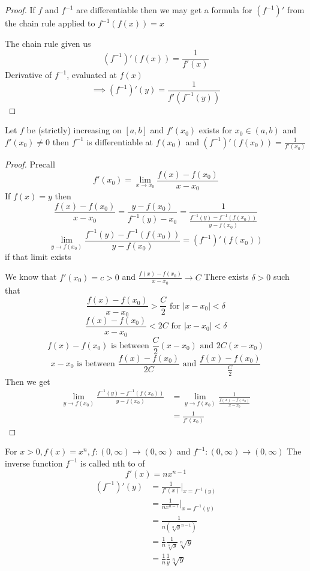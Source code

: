 \begin{proof}
  If $f$ and $f^{-1}$ are differentiable then we may get a formula for $(f^{-1})'$ from the chain rule applied to $f^{-1}(f(x)) = x$

  The chain rule given us
  $$(f^{-1})'(f(x)) = \frac{1}{f'(x)}$$
  Derivative of $f^{-1}$, evaluated at $f(x)$
  $$\implies (f^{-1})'(y) = \frac{1}{f'(f^{-1}(y))}$$
\end{proof}

\begin{theorem*}
  Let $f$ be (strictly) increasing on $[a, b]$ and $f'(x_0)$ exists for $x_0 \in (a, b)$ and $f'(x_0) \neq 0$ then $f^{-1}$ is differentiable at $f(x_0)$
  and $(f^{-1})'(f(x_0)) = \frac{1}{f'(x_0)}$
\end{theorem*}

\begin{proof}
  Precall $$f'(x_0) = \lim\limits_{x \to x_0}\frac{f(x) - f(x_0)}{x-x_0}$$
  If $f(x) = y$ then $$\frac{f(x) - f(x_0)}{x-x_0} = \frac{y-f(x_0)}{f^{-1}(y) - x_0} = \frac{1}{\frac{f^{-1}(y) - f^{-1}(f(x_0))}{y-f(x_0)}}$$
  $$\lim\limits_{y \to f(x_0)}\frac{f^{-1}(y) - f^{-1}(f(x_0))}{y - f(x_0)} = (f^{-1})'(f(x_0))$$
  if that limit exists

  We know that $f'(x_0) = c > 0$ and $\frac{f(x) - f(x_0)}{x - x_0} \to C$
  There exists $\delta > 0$ such that 
  $$\frac{f(x) - f(x_0)}{x - x_0} > \frac{C}{2} \text{ for } |x - x_0| < \delta$$
  $$\frac{f(x) - f(x_0)}{x - x_0} < 2C \text{ for } |x - x_0| < \delta$$
  $$f(x) - f(x_0) \text{ is between } \frac{C}{2}(x - x_0) \text{ and } 2C(x-x_0)$$
  $$x - x_0 \text{ is between } \frac{f(x) - f(x_0)}{2C} \text{ and } \frac{f(x) - f(x_0)}{\frac{C}{2}}$$
  Then we get
  \begin{align*}
    \lim\limits_{y \to f(x_0)} \frac{f^{-1}(y) - f^{-1}(f(x_0))}{y - f(x_0)} &= \lim\limits_{y \to f(x_0)} \frac{1}{\frac{f(x) - f(x_0)}{x-x_0}}\\
    &= \frac{1}{f'(x_0)}
  \end{align*}
\end{proof}

\begin{example*}
  For $x > 0, f(x) = x^n, f:(0, \infty) \to (0, \infty)$ and $f^{-1}: (0, \infty) \to (0, \infty)$
  The inverse function $f^{-1}$ is called nth to of
  $$f'(x) = nx^{n-1}$$
  \begin{align*}
  (f^{-1})'(y) &= \frac{1}{f'(x)} |_{x=f^{-1}(y)} \\
  &= \frac{1}{nx^{n-1}}|_{x = f^{-1}(y)} \\
  &= \frac{1}{n(\sqrt[n]{y}^{n-1})} \\
  &= \frac{1}{n}\frac{1}{\sqrt[n]{y}}\sqrt[n]{y} \\
  &= \frac{1}{n}\frac{1}{y}\sqrt[n]{y}
  \end{align*}
\end{example*}

